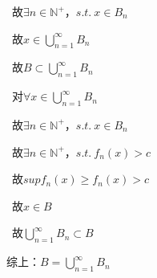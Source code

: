 \par \quad \ 故$\exists n \in \mathbb{N}^{+}$，$s.t. \ x \in B_{n}$
\par \quad \ 故$x \in \bigcup \limits_{n=1}^{\infty}B_{n}$
\par \quad \ 故$B \subset \bigcup \limits_{n=1}^{\infty}B_{n}$
\par {} \ 对$\forall x \in \bigcup  \limits_{n=1}^{\infty}B_{n}$
\par \quad \ 故$\exists n \in \mathbb{N}^{+}$，$s.t. \ x \in B_{n}$
\par \quad \ 故$\exists n \in \mathbb{N}^{+}$，$s.t. \ f_{n}(x) > c$
\par \quad \ 故$sup f_{n}(x) \geqslant  f_{n}(x) > c$
\par \quad \ 故$x \in B$
\par \quad \ 故$\bigcup \limits_{n=1}^{\infty}B_{n} \subset B$
\par 综上：$B = \bigcup \limits_{n=1}^{\infty}B_{n}$

